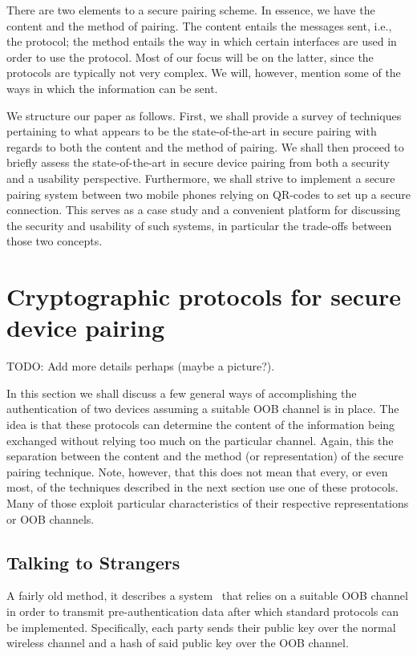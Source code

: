 \documentclass[conference, 11pt]{sty/IEEEtran}
\begin{document}
There are two elements to a secure pairing scheme.
In essence, we have the content and the method of pairing.
The content entails the messages sent, i.e., the protocol; the method entails the way in which certain interfaces are used in order to use the protocol.
Most of our focus will be on the latter, since the protocols are typically not very complex.
We will, however, mention some of the ways in which the information can be sent.

We structure our paper as follows.
First, we shall provide a survey of techniques pertaining to what appears to be the state-of-the-art in secure pairing with regards to both the content and the method of pairing.
We shall then proceed to briefly assess the state-of-the-art in secure device pairing from both a security and a usability perspective.
Furthermore, we shall strive to implement a secure pairing system between two mobile phones relying on QR-codes to set up a secure connection.
This serves as a case study and a convenient platform for discussing the security and usability of such systems, in particular the trade-offs between those two concepts.

\section{Cryptographic protocols for secure device pairing}
\label{sec:cryptographic_protocols_for_secure_device_pairing}

TODO: Add more details perhaps (maybe a picture?).

In this section we shall discuss a few general ways of accomplishing the authentication of two devices assuming a suitable OOB channel is in place.
The idea is that these protocols can determine the content of the information being exchanged without relying too much on the particular channel.
Again, this the separation between the content and the method (or representation) of the secure pairing technique.
Note, however, that this does not mean that every, or even most, of the techniques described in the next section use one of these protocols.
Many of those exploit particular characteristics of their respective representations or OOB channels.

\subsection{Talking to Strangers}
\label{ssec:talking_to_strangers}

A fairly old method, it describes a system~\cite{balfanz2002talking} that relies on a suitable OOB channel in order to transmit pre-authentication data after which standard protocols can be implemented.
Specifically, each party sends their public key over the normal wireless channel and a hash of said public key over the OOB channel.
\end{document}
